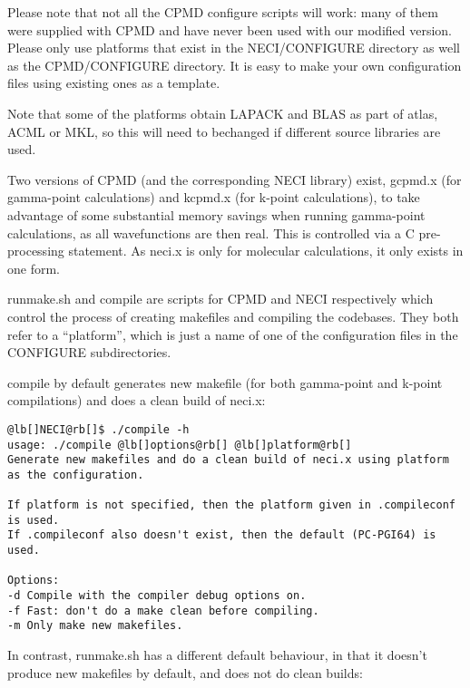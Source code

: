 \documentclass[openany,a4paper,10pt]{manual}
\begin{document}
Please note that not all the CPMD configure scripts will work: many of
them were supplied with CPMD and have never been used with our modified
version.  Please only use platforms that exist in the NECI/CONFIGURE
directory as well as the CPMD/CONFIGURE directory.  It is easy to make
your own configuration files using existing ones as a template.

Note that some of the platforms obtain LAPACK and BLAS as part of atlas,
ACML or MKL, so this will need to bechanged if different source libraries
are used.

Two versions of CPMD (and the corresponding NECI library) exist, gcpmd.x
(for gamma-point calculations) and kcpmd.x (for k-point calculations),
to take advantage of some substantial memory savings when running
gamma-point calculations, as all wavefunctions are then real.  This is
controlled via a C pre-processing statement.  As neci.x is only for
molecular calculations, it only exists in one form.

runmake.sh and compile are scripts for CPMD and NECI respectively which
control the process of creating makefiles and compiling the codebases.
They both refer to a ``platform'', which is just a name of one of the
configuration files in the CONFIGURE subdirectories.

compile by default generates new makefile (for both gamma-point and
k-point compilations) and does a clean build of neci.x:

\begin{Verbatim}[commandchars=@\[\]]
@lb[]NECI@rb[]$ ./compile -h
usage: ./compile @lb[]options@rb[] @lb[]platform@rb[]
Generate new makefiles and do a clean build of neci.x using platform as the configuration.

If platform is not specified, then the platform given in .compileconf is used.
If .compileconf also doesn't exist, then the default (PC-PGI64) is used.

Options:
-d Compile with the compiler debug options on.
-f Fast: don't do a make clean before compiling.
-m Only make new makefiles.
\end{Verbatim}

In contrast, runmake.sh has a different default behaviour, in that it
doesn't produce new makefiles by default, and does not do clean builds:
\end{document}
